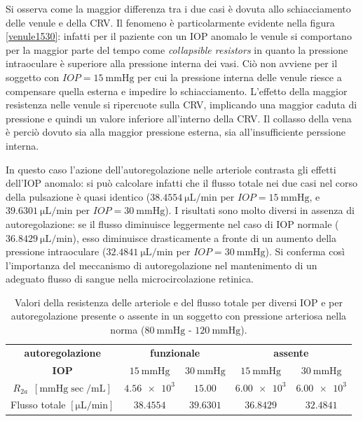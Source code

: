 \documentclass{article}
\begin{document}
Si osserva come la maggior differenza tra i due casi è dovuta allo schiacciamento delle venule e della CRV.
Il fenomeno è particolarmente evidente nella figura \ref{venule1530}: infatti per il paziente con un IOP anomalo le venule si comportano per la maggior parte del tempo come \textit{collapsible resistors} in quanto la pressione intraoculare è superiore alla pressione interna dei vasi.
Ciò non avviene per il soggetto con $IOP = \SI{15}{\mmHg}$ per cui la pressione interna delle venule riesce a compensare quella esterna e impedire lo schiacciamento.
L'effetto della maggior resistenza nelle venule si ripercuote sulla CRV, implicando una maggior caduta di pressione e quindi un valore inferiore all'interno della CRV.
Il collasso della vena è perciò dovuto sia alla maggior pressione esterna, sia all'insufficiente perssione interna.

In questo caso l'azione dell'autoregolazione nelle arteriole contrasta gli effetti dell'IOP anomalo: si può calcolare infatti che il flusso totale nei due casi nel corso della pulsazione è quasi identico ($\SI{38.4554}{\micro \liter \per \minute}$ per $IOP = \SI{15}{\mmHg}$, e $\SI{39.6301}{\micro \liter \per \minute}$ per $IOP = \SI{30}{\mmHg}$).
I risultati sono molto diversi in assenza di autoregolazione: se il flusso diminuisce leggermente nel caso di IOP normale ($\SI{36.8429}{\micro \liter \per \minute}$), esso diminuisce drasticamente a fronte di un aumento della pressione intraoculare ($\SI{32.4841}{\micro \liter \per \minute}$ per $IOP = \SI{30}{\mmHg}$).
Si conferma così l'importanza del meccanismo di autoregolazione nel mantenimento di un adeguato flusso di sangue nella microcircolazione retinica.
\FloatBarrier
\begin{table}[h!]
\begin{tabular}{|c|cc|cc|}
\hline
 \textbf{autoregolazione}& \multicolumn{2}{c|}{\textbf{funzionale}} & \multicolumn{2}{c|}{\textbf{assente}} \\
 \textbf{IOP}& $\SI{15}{\mmHg}$ & $\SI{30}{\mmHg}$ & $\SI{15}{\mmHg}$ & $\SI{30}{\mmHg}$ \\
 \hline
$R_{2a}$\ $[\si{\mmHg \sec \per \milli \liter}]$ &$\num{4.56e3}$ &$\num{15.00}$ &$ \num{6.00e3}$&$ \num{6.00e3}$ \\
 Flusso totale $[\si{\micro \liter \per \minute}]$&$38.4554$&$39.6301$ &$36.8429$&$32.4841$\\
 \hline
\end{tabular}
\caption{Valori della resistenza delle arteriole e del flusso totale per diversi IOP e per autoregolazione presente o assente in un soggetto con pressione arteriosa nella norma ($\SI{80}{\mmHg}$ - $\SI{120}{\mmHg}$).}
\label{riassunto_res1}
\end{table}
\end{document}
